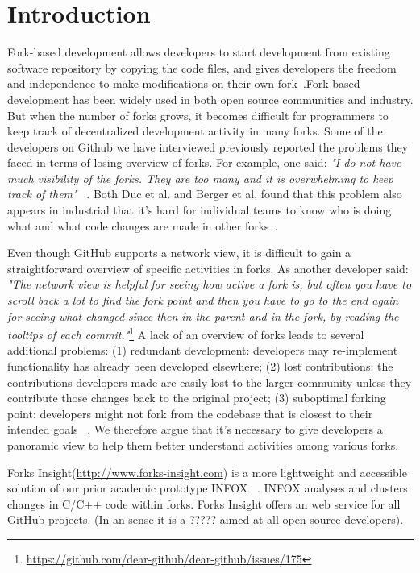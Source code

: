 \section{Introduction}
Fork-based development allows developers to start development from existing software repository by copying the code files, and gives developers the freedom and independence to make modifications on their own fork~\cite{dubinsky2013exploratory, bitzer2006impact, ernst2010code,vetter2007open}.Fork-based development has been widely used in both open source communities and industry. But when the number of forks grows, it becomes difficult for programmers to keep track of decentralized development activity in many forks. Some of the developers on Github we have interviewed previously reported the problems they faced in terms of losing overview of forks. For example, one said: \emph{"I do not have much visibility of the forks. They are too many and it is overwhelming to keep track of them"} ~\cite{ZSLXWK:ICSE18}. Both Duc et al. and Berger et al. found that this problem also appears in industrial that it's hard for individual teams to know who is doing what and what code changes are made in other forks~\cite{berger2014three,Duc:2014:FCM:2652524.2652546}.

Even though GitHub supports a network view, it is difficult to gain a straightforward overview of specific activities in forks. As another developer said: \emph{"The network view is helpful for seeing how active a fork is, but often you have to scroll back a lot to find the fork point and then you have to go to the end again for seeing what changed since then in the parent and in the fork, by reading the tooltips of each commit."}\footnote{\url{https://github.com/dear-github/dear-github/issues/175}}
 A lack of an overview of forks leads to several additional problems: (1) redundant development: developers may re-implement functionality has already been developed elsewhere; (2) lost contributions: the contributions developers made are easily lost to the larger community unless they contribute those changes back to the original project; (3) suboptimal forking point: developers might not fork from the codebase that is closest to their intended goals ~\cite{ZSLXWK:ICSE18, dubinsky2013exploratory,stanciulescu2015forked}. We therefore argue that  it's necessary to give developers a panoramic view to help them better understand activities among various forks.

Forks Insight(\url{http://www.forks-insight.com}) is a more lightweight and accessible solution of our prior academic prototype INFOX ~\cite{ZSLXWK:ICSE18}. INFOX analyses and clusters changes in C/C++ code within forks. Forks Insight offers an web service for all GitHub projects. (In an sense it is a ????? aimed at all open source developers). 


